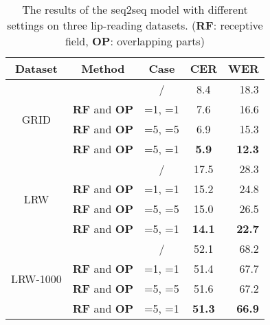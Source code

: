 \documentclass[a4paper, 10pt, conference]{ieeeconf}      \usepackage{FG2020}
\begin{document}
\begin{table}[H]
	\setlength{\abovecaptionskip}{0.0cm}
	
	\caption{The results of the seq2seq model with different settings on three lip-reading datasets. (\textbf{RF}: receptive field, \textbf{OP}: overlapping parts)}
	\label{table1}
	\begin{center}
		\begin{tabular}{|c||c|c||c|r|}    
			\hline
			Dataset & Method& Case& CER  &  WER  \\
			\hline
			\hline
			\multirow{4}{*}{GRID}&     & / &8.4 & 18.3 \\
			~&     \textbf{RF} and  \textbf{OP}&=1, =1& 7.6 & 16.6\\
			~&     \textbf{RF} and  \textbf{OP}&=5, =5& 6.9 & 15.3 \\
			~    & \textbf{RF} and  \textbf{OP} &=5, =1& \textbf{5.9} & \textbf{12.3} \\
			\hline
			\multirow{4}{*}{LRW}& & /&17.5 & 28.3  \\
			~& \textbf{RF} and \textbf{OP}&=1, =1& 15.2 & 24.8 \\
			~& \textbf{RF} and  \textbf{OP}&=5, =5& 15.0 & 26.5 \\
			~& \textbf{RF} and  \textbf{OP} &=5, =1& \textbf{14.1} & \textbf{22.7} \\
			\hline
			\multirow{4}{*}{LRW-1000}&             &/  & 52.1 & 68.2     \\
			~& \textbf{RF} and  \textbf{OP} &=1, =1& 51.4 & 67.7    \\
			~& \textbf{RF} and  \textbf{OP} & =5, =5& 51.6   &   67.2      \\
			~& \textbf{RF} and  \textbf{OP} &=5, =1& \textbf{51.3} & \textbf{66.9}      \\
			\hline
		\end{tabular}
	\end{center}
\end{table}
\end{document}

